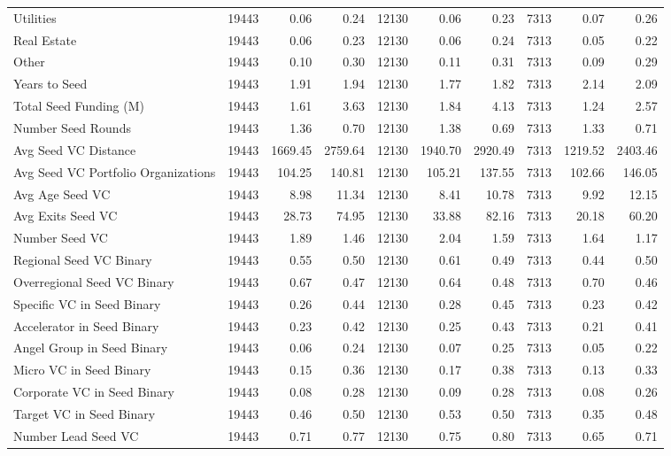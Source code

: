 {\begin{table}[!h]
{\begin{tabular}[t]{lrrrrrrrrr}
Utilities & 19443 & 0.06 & 0.24 & 12130 & 0.06 & 0.23 & 7313 & 0.07 & 0.26\\
Real Estate & 19443 & 0.06 & 0.23 & 12130 & 0.06 & 0.24 & 7313 & 0.05 & 0.22\\
Other & 19443 & 0.10 & 0.30 & 12130 & 0.11 & 0.31 & 7313 & 0.09 & 0.29\\
Years to Seed & 19443 & 1.91 & 1.94 & 12130 & 1.77 & 1.82 & 7313 & 2.14 & 2.09\\
\addlinespace
Total Seed Funding (M) & 19443 & 1.61 & 3.63 & 12130 & 1.84 & 4.13 & 7313 & 1.24 & 2.57\\
Number Seed Rounds & 19443 & 1.36 & 0.70 & 12130 & 1.38 & 0.69 & 7313 & 1.33 & 0.71\\
Avg Seed VC Distance & 19443 & 1669.45 & 2759.64 & 12130 & 1940.70 & 2920.49 & 7313 & 1219.52 & 2403.46\\
Avg Seed VC Portfolio Organizations & 19443 & 104.25 & 140.81 & 12130 & 105.21 & 137.55 & 7313 & 102.66 & 146.05\\
Avg Age Seed VC & 19443 & 8.98 & 11.34 & 12130 & 8.41 & 10.78 & 7313 & 9.92 & 12.15\\
\addlinespace
Avg Exits Seed VC & 19443 & 28.73 & 74.95 & 12130 & 33.88 & 82.16 & 7313 & 20.18 & 60.20\\
Number Seed VC & 19443 & 1.89 & 1.46 & 12130 & 2.04 & 1.59 & 7313 & 1.64 & 1.17\\
Regional Seed VC Binary & 19443 & 0.55 & 0.50 & 12130 & 0.61 & 0.49 & 7313 & 0.44 & 0.50\\
Overregional Seed VC Binary & 19443 & 0.67 & 0.47 & 12130 & 0.64 & 0.48 & 7313 & 0.70 & 0.46\\
Specific VC in Seed Binary & 19443 & 0.26 & 0.44 & 12130 & 0.28 & 0.45 & 7313 & 0.23 & 0.42\\
\addlinespace
Accelerator in Seed Binary & 19443 & 0.23 & 0.42 & 12130 & 0.25 & 0.43 & 7313 & 0.21 & 0.41\\
Angel Group in Seed Binary & 19443 & 0.06 & 0.24 & 12130 & 0.07 & 0.25 & 7313 & 0.05 & 0.22\\
Micro VC in Seed Binary & 19443 & 0.15 & 0.36 & 12130 & 0.17 & 0.38 & 7313 & 0.13 & 0.33\\
Corporate VC in Seed Binary & 19443 & 0.08 & 0.28 & 12130 & 0.09 & 0.28 & 7313 & 0.08 & 0.26\\
Target VC in Seed Binary & 19443 & 0.46 & 0.50 & 12130 & 0.53 & 0.50 & 7313 & 0.35 & 0.48\\
\addlinespace
Number Lead Seed VC & 19443 & 0.71 & 0.77 & 12130 & 0.75 & 0.80 & 7313 & 0.65 & 0.71\\

\end{tabular}}
\end{table}}
